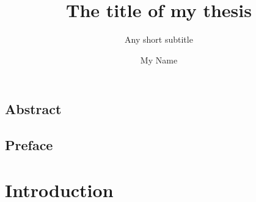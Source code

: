 \documentclass[UKenglish]{ifimaster}
\title{The title of my thesis}
\subtitle{Any short subtitle}
\author{My Name}
\begin{document}
\ififorside{}
\frontmatter{}
\maketitle{}

\chapter*{Abstract}                   

\tableofcontents{}
\listoffigures{}
\listoftables{}

\chapter*{Preface}                    

\mainmatter{}
\part{Introduction}                   


\backmatter{}
\printbibliography
\end{document}
